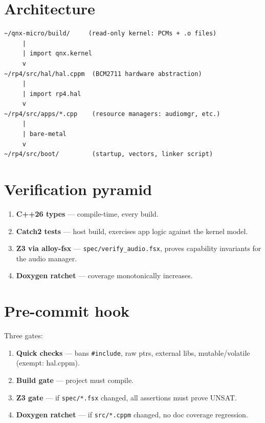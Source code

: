 \documentclass[11pt]{article}
\begin{document}
\section{Architecture}

\begin{Verbatim}[fontsize=\small,frame=single]
~/qnx-micro/build/     (read-only kernel: PCMs + .o files)
     |
     | import qnx.kernel
     v
~/rp4/src/hal/hal.cppm  (BCM2711 hardware abstraction)
     |
     | import rp4.hal
     v
~/rp4/src/apps/*.cpp    (resource managers: audiomgr, etc.)
     |
     | bare-metal
     v
~/rp4/src/boot/         (startup, vectors, linker script)
\end{Verbatim}

\section{Verification pyramid}

\begin{enumerate}[leftmargin=2em]
\item \textbf{C++26 types} --- compile-time, every build.
\item \textbf{Catch2 tests} --- host build, exercises app logic
  against the kernel model.
\item \textbf{Z3 via alloy-fsx} --- \texttt{spec/verify\_audio.fsx},
  proves capability invariants for the audio manager.
\item \textbf{Doxygen ratchet} --- coverage monotonically increases.
\end{enumerate}

\section{Pre-commit hook}

Three gates:
\begin{enumerate}[leftmargin=2em]
\item \textbf{Quick checks} --- bans \texttt{\#include}, raw ptrs,
  external libs, mutable/volatile (exempt: hal.cppm).
\item \textbf{Build gate} --- project must compile.
\item \textbf{Z3 gate} --- if \texttt{spec/*.fsx} changed,
  all assertions must prove UNSAT.
\item \textbf{Doxygen ratchet} --- if \texttt{src/*.cppm} changed,
  no doc coverage regression.
\end{enumerate}
\end{document}
